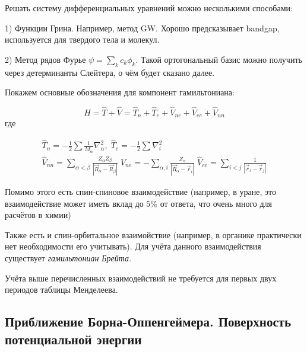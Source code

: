 \documentclass[12pt, oneside]{article}
\numberwithin{equation}{section}  %
\begin{document}
Решать систему дифференциальных уравнений можно несколькими способами:

1) Функции Грина. Например, метод GW. Хорошо предсказывает bandgap, используется для твердого тела и молекул.

2) Метод рядов Фурье \(\psi = \sum_k c_k \phi_k\). Такой ортогональный базис можно получить через детерминанты Слейтера, о чём будет сказано далее.


Покажем основные обозначения для компонент гамильтониана:

\begin{equation}
    \hat{H} = \hat{T} + \hat{V} = \hat{T}_n + \hat{T}_e + \hat{V}_{ne} + \hat{V}_{ee} + \hat{V}_{nn}
\end{equation}
где 


\begin{gather}
\label{eq:kin}
\hat{T}_n = - \frac{1}{2} \sum \frac{1}{M_\alpha} \nabla_\alpha^2,\; \hat{T}_e = - \frac{1}{2} \sum \nabla_i^2 \\
\hat{V}_{nn} = \sum_{\alpha < \beta} \frac{Z_\alpha Z_\beta}{|\vec{R}_\alpha - \vec{R}_\beta|} \;
\hat{V}_{ne} = - \sum_{\alpha, i} \frac{Z_\alpha}{|\vec{R}_\alpha - \vec{r}_i|} \;
\hat{V}_{ee} = \sum_{i < j} \frac{1}{|\vec{r}_i - \vec{r}_j|}
\end{gather}

Помимо этого есть спин-спиновое взаимодействие (например, в уране, это взаимодействие может иметь вклад до \(5 \%\) от ответа, что очень много для расчётов в химии)

Также есть и спин-орбитальное взаимойствие (например, в органике практически нет необходимости его учитывать). Для учёта данного взаимодействия существует \textit{гамильтониан Брейта}.

Учёта выше перечисленных взаимодействий не требуется для первых двух периодов таблицы Менделеева. 

\subsection{Приближение Борна-Оппенгеймера. Поверхность потенциальной энергии}
\end{document}
